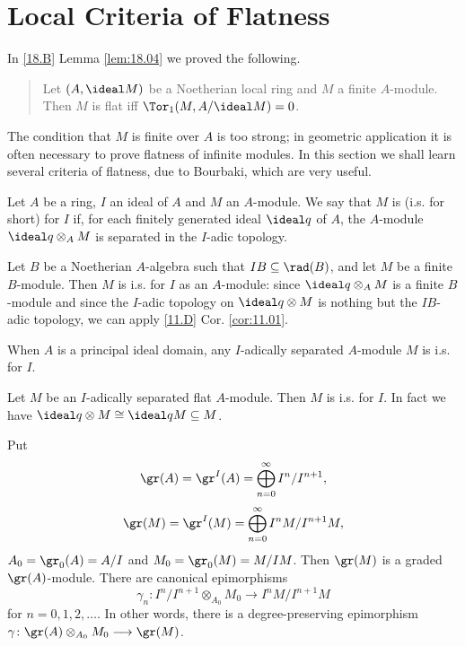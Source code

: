 \documentclass[../main]{subfiles}
\begin{document}
\section{Local Criteria of Flatness}\label{sec:20}
\newparagraph In \ref{18.B} Lemma \ref{lem:18.04} %
we proved the following.

\begin{quote}
    Let $(A,\ideal M)$ be a Noetherian local ring and $M$ a finite $A$-module. Then $M$ is flat iff $\Tor_1(M,A/\ideal M) = 0$.
\end{quote}
The condition that $M$ is finite over $A$ is too strong; in geometric application it is often necessary to prove flatness of infinite modules. In this section we shall learn several criteria of flatness, due to Bourbaki, which are very useful. 

Let $A$ be a ring, $I$ an ideal of $A$ and $M$ an $A$-module. We say that $M$ is  (i.s. for short) for $I$ if, for each finitely generated ideal $\ideal q$ of $A$, the $A$-module $\ideal q\otimes_A M$ is separated in the $I$-adic topology.

\begin{example}
Let $B$ be a Noetherian $A$-algebra such that $IB\subseteq \rad(B)$, and let $M$ be a finite $B$-module. Then $M$ is i.s. for $I$ as an $A$-module: since $\ideal q\otimes_A M$ is a finite $B$-module and since the $I$-adic topology on $\ideal q\otimes M$ is nothing but the $IB$-adic topology, we can apply \ref{11.D} %
Cor. \ref{cor:11.01}.
\end{example}

\begin{example}
When $A$ is a principal ideal domain, any $I$-adically separated $A$-module $M$ is i.s. for $I$.
\end{example}

\begin{example}
Let $M$ be an $I$-adically separated flat $A$-module. Then $M$ is i.s. for $I$. In fact we have $\ideal q\otimes M\cong \ideal q M\subseteq M$.
\end{example}

\newparagraph Put \[\gr(A) = \gr^I(A) = \bigoplus_{n=0}^\infty I^n/I^{n+1},\] \[\gr(M) = \gr^I(M) = \bigoplus_{n=0}^\infty I^nM/I^{n+1}M,\] $A_0 = \gr_0(A) = A/I$ and $M_0 = \gr_0(M) = M/IM$. Then $\gr(M)$ is a graded $\gr(A)$-module. There are canonical epimorphisms \[\gamma_n\colon I^n/I^{n+1}\otimes_{A_0}M_0\longrightarrow I^nM/I^{n+1}M\] for $n = 0,1,2,\ldots$. In other words, there is a degree-preserving epimorphism $\gamma\colon \gr(A)\otimes_{A_0}M_0\longrightarrow \gr(M)$.
\end{document}
